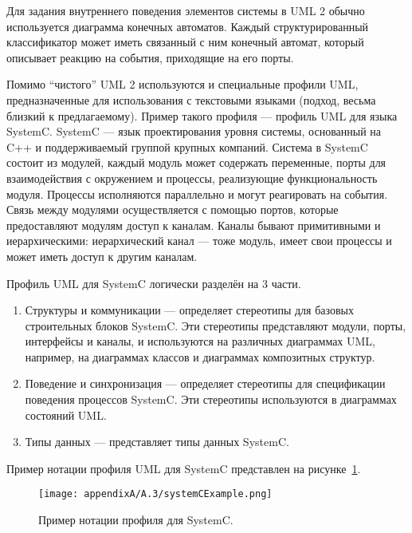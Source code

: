 Для задания внутреннего поведения элементов системы в UML 2 обычно используется диаграмма 
конечных автоматов. Каждый структурированный классификатор может иметь связанный с 
ним конечный автомат, который описывает реакцию на события, приходящие на его порты.

Помимо "`чистого"' UML 2 используются и специальные профили UML, предназначенные для 
использования с текстовыми языками (подход, весьма близкий к предлагаемому). Пример 
такого профиля --- 
профиль UML для языка SystemC. SystemC
--- язык проектирования уровня системы, основанный на C++ и поддерживаемый группой крупных компаний. 
Система в SystemC состоит из модулей, каждый модуль может содержать переменные, порты 
для взаимодействия с окружением и процессы, реализующие функциональность модуля. Процессы
исполняются параллельно и могут реагировать на события. Связь между модулями осуществляется 
с помощью портов, которые предоставляют модулям доступ к каналам. Каналы бывают примитивными 
и иерархическими: иерархический канал --- тоже модуль, имеет свои процессы и может иметь 
доступ к другим каналам.

Профиль UML для SystemC логически разделён на 3 части.
\begin{enumerate}
	\item Структуры и коммуникации --- определяет стереотипы для базовых строительных 
		блоков SystemC. Эти стереотипы представляют модули, порты, интерфейсы и каналы, 
		и используются на различных диаграммах UML, например, на диаграммах классов и 
		диаграммах композитных структур.
	\item Поведение и синхронизация --- определяет стереотипы для спецификации поведения 
		процессов SystemC. Эти стереотипы используются в диаграммах состояний UML.
	\item Типы данных --- представляет типы данных SystemC.
\end{enumerate}

Пример нотации профиля UML для SystemC представлен на рисунке~\ref{image:systemCExample}.

\begin{figure} [ht]
	\begin{center}
		\texttt{[image: appendixA/A.3/systemCExample.png]}
		\caption{Пример нотации профиля для SystemC.}
		\label{image:systemCExample}
	\end{center}
\end{figure}

